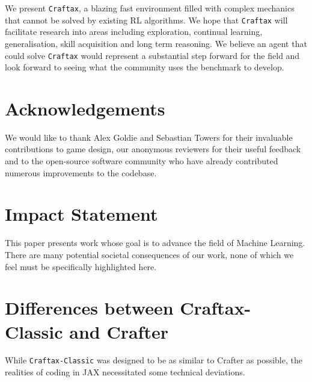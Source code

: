 \documentclass{article}
\theoremstyle{plain}
\theoremstyle{definition}
\theoremstyle{remark}
\begin{document}
We present \texttt{Craftax}, a blazing fast environment filled with complex mechanics that cannot be solved by existing RL algorithms.  We hope that \texttt{Craftax} will facilitate research into areas including exploration, continual learning, generalisation, skill acquisition and long term reasoning.  We believe an agent that could solve \texttt{Craftax} would represent a substantial step forward for the field and look forward to seeing what the community uses the benchmark to develop.

\section*{Acknowledgements}
We would like to thank Alex Goldie and Sebastian Towers for their invaluable contributions to game design, our anonymous reviewers for their useful feedback and to the open-source software community who have already contributed numerous improvements to the codebase.

\section*{Impact Statement}
This paper presents work whose goal is to advance the field of Machine Learning. There are many potential societal consequences of our work, none of which we feel must be specifically highlighted here.





\newpage
\appendix
\onecolumn
\section{Differences between Craftax-Classic and Crafter} \label{app:crafter_diff}

While \texttt{Craftax-Classic} was designed to be as similar to Crafter as possible, the realities of coding in JAX necessitated some technical deviations.
\end{document}
